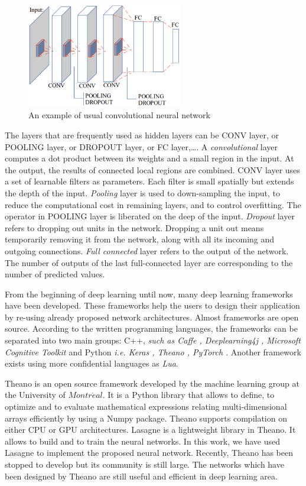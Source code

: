 \documentclass{article} %
\begin{document}
\begin{multicols}{2}
\begin{figure}[H]
	\centerline{\includegraphics[height=1.8in]{images/convarc.eps}}
	\caption{\footnotesize{An example of usual convolutional neural network}}
	\label{figconvarc}
\end{figure}

The layers that are frequently used as hidden layers can be CONV layer, or POOLING layer, or DROPOUT layer, or FC layer,\ldots. A \textit{convolutional} layer computes a dot product between its weights and a small region in the input. At the output, the results of connected local regions are combined. CONV layer uses a set of learnable filters as parameters. Each filter is small spatially but extends the depth of the input. \textit{Pooling} layer is used to down-sampling the input, to reduce the computational cost in remaining layers, and to control overfitting. The operator in POOLING layer is liberated on the deep of the input. \textit{Dropout} layer refers to dropping out units in the network. Dropping a unit out means temporarily removing it from the network, along with all its incoming and outgoing connections. \textit{Full connected} layer refers to the output of the network. The number of outputs of the last full-connected layer are corresponding to the number of predicted values.

From the beginning of deep learning until now, many deep learning frameworks have been developed.
These frameworks help the users to design their application by re-using already proposed network architectures. Almost frameworks are open source. According to the written programming languages, the frameworks can be separated into two main groups: C++, \textit{such as Caffe \cite{jia2014caffe}, Deeplearning4j \cite{team2016deeplearning4j}, Microsoft Cognitive Toolkit \cite{yu2014introduction}} and Python \textit{i.e. Keras \cite{chollet2015keras}, Theano \cite{theanoframework}, PyTorch \cite{paszke2017automatic}}. Another framework exists using more confidential languages as \textit{Lua}.

Theano \cite{theanoframework} is an open source framework developed by the machine learning group at the University of $Montr\acute{e}al$. It is a Python library that allows to define, to optimize and to evaluate mathematical expressions relating multi-dimensional arrays efficiently by using a Numpy package. Theano supports compilation on either CPU or GPU architectures. Lasagne \cite{lasagne} is a lightweight library in Theano. It allows to build and to train the neural networks. In this work, we have used Lasagne to implement the proposed neural network. Recently, Theano has been stopped to develop but its community is still large. The networks which have been designed by Theano are still useful and efficient in deep learning area.

\end{multicols}
\end{document}
